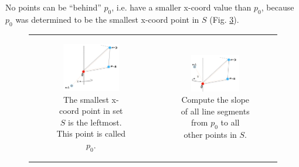 \documentclass [12pt]{article}
\begin{document}
\begin{enumerate}[label=(\alph*)]
        \pagebreak

        No points can be ``behind'' $p_0$, i.e. have a smaller x-coord value than $p_0$, because $p_0$ was determined to be the smallest x-coord point in $S$ (Fig. \ref{fig:wrongstar}).

        \begin{figure}[h] 
            \begin{tabular}{cc}
                \begin{subfigure}{0.5\textwidth}
                    \centering
                    \includegraphics[width=0.8\textwidth]{images/star10.PNG}
                    \caption{The smallest x-coord point in set $S$ is the leftmost. This point is called $p_0$.}
                    \label{fig:star10}
                \end{subfigure} &
                \begin{subfigure}{0.5\textwidth}
                    \centering
                    \includegraphics[width=0.7\textwidth]{images/star11.PNG}
                    \caption{Compute the slope of all line segments from $p_0$ to all other points in $S$.}
                    \label{fig:star11}
                \end{subfigure}
            \end{tabular}
            \caption{}
            \label{fig:wrongstar}
        \end{figure}




\end{enumerate}
\end{document}
